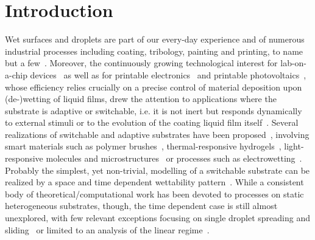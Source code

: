 \section{Introduction} 
Wet surfaces and droplets are part of our every-day experience and of numerous industrial processes including coating, tribology, painting and printing, to name but a few~\cite{grossFluidFilmLubrication1980,szeriFluidFilmLubrication2010,deryckGravityInertiaEffects1998,quereFluidCoatingFiber1999,dasilvasobrinhoStudyDefectsUltrathin1999,singhInkjetPrintingProcess2010,joEvaluationJetPerformance2009,wijshoffDynamicsPiezoInkjet2010}. 
Moreover, the continuously growing technological interest for lab-on-a-chip devices~\cite{samieiReviewDigitalMicrofluidics2016,fockeLabonaFoilMicrofluidicsThin2010} as well as for printable electronics~\cite{kimHighlyConductiveInk2005, luechingerGraphenestabilizedCopperNanoparticles2008} and printable photovoltaics~\cite{brabecPlasticSolarCells2001,ronsinRoleInterplaySpinodal2020}, whose efficiency relies crucially on a precise control of material deposition upon (de-)wetting of liquid films, drew the attention to applications where the substrate is adaptive or switchable, i.e. it is not inert but responds dynamically to external stimuli or to the evolution of the coating liquid film itself~\cite{buttAdaptiveWettingAdaptation2018,guoInspiredSmartMaterials2016}. 
Several realizations of switchable and adaptive substrates have been proposed~\cite{liuControlledSwitchableSurface2005, xinReversiblySwitchableWettability2010}, involving smart materials such as polymer brushes~\cite{stuartEmergingApplicationsStimuliresponsive2010,ayresStimuliResponsivePolyelectrolytePolymer2007,yongCononsolvencyTransitionPolymer2018}, thermal-responsive hydrogels~\cite{chenThermalresponsiveHydrogelSurface2010}, light-responsive molecules and microstructures~\cite{ichimuraLightDrivenMotionLiquids2000,delormeAzobenzeneContainingMonolayerPhotoswitchable2005,oscuratoLightDrivenWettabilityTailoring2017} or processes such as electrowetting~\cite{mugeleElectrowettingConvenientWay2005}.
Probably the simplest, yet non-trivial, modelling of a switchable substrate can be realized by a space and time dependent wettability pattern~\cite{grawitterSteeringDropletsSubstrates2021}. 
While a consistent body of theoretical/computational work has been devoted to processes on static heterogeneous substrates, though, the time dependent case is still almost unexplored, with few relevant exceptions focusing on single droplet spreading and sliding~\cite{grawitterSteeringDropletsSubstrates2021,grawitterDropletsSubstratesOscillating2021,thieleGradientDynamicsModel2020} or limited to an analysis of the linear regime~\cite{sumanDynamicsThinLiquid2006}.

